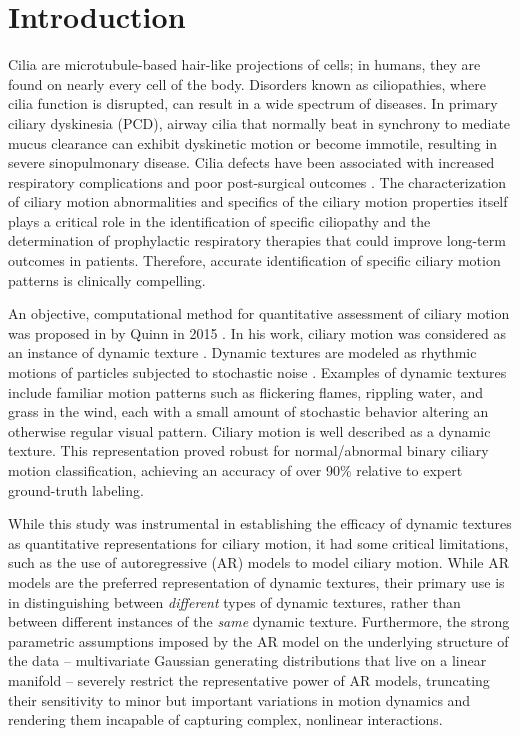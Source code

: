 \section{Introduction}

Cilia are microtubule-based hair-like projections of cells; in humans, they are found on nearly every cell of the body. Disorders known as ciliopathies, where cilia function is disrupted, can result in a wide spectrum of diseases. In primary ciliary dyskinesia (PCD), airway cilia that normally beat in synchrony to mediate mucus clearance can exhibit dyskinetic motion or become immotile, resulting in severe sinopulmonary disease\cite{o2007diagnosing}. Cilia defects have been associated with increased respiratory complications and poor post-surgical outcomes \cite{nakhleh2012high}. The characterization of ciliary motion abnormalities and specifics of the ciliary motion properties itself plays a critical role in the identification of specific ciliopathy and the determination of prophylactic respiratory therapies that could improve long-term outcomes in patients. Therefore, accurate identification of specific ciliary motion patterns is clinically compelling.

An objective, computational method for quantitative assessment of ciliary motion was proposed in by Quinn in 2015 \cite{quinn2015automated}. In his work, ciliary motion was considered as an instance of dynamic texture \cite{saisan2001dynamic}. Dynamic textures are modeled as rhythmic motions of particles subjected to stochastic noise \cite{chen2013automatic}. Examples of dynamic textures include familiar motion patterns such as flickering flames, rippling water, and grass in the wind, each with a small amount of stochastic behavior altering an otherwise regular visual pattern. Ciliary motion is well described as a dynamic texture. This representation proved robust for normal/abnormal binary ciliary motion classification, achieving an accuracy of over 90\% relative to expert ground-truth labeling.

While this study was instrumental in establishing the efficacy of dynamic textures as quantitative representations for ciliary motion, it had some critical limitations, such as the use of autoregressive (AR) models \cite{hyndman2007higher} to model ciliary motion. While AR models are the preferred representation of dynamic textures, their primary use is in distinguishing between \textit{different} types of dynamic textures, rather than between different instances of the \textit{same} dynamic texture. Furthermore, the strong parametric assumptions imposed by the AR model on the underlying structure of the data -- multivariate Gaussian generating distributions that live on a linear manifold -- severely restrict the representative power of AR models, truncating their sensitivity to minor but important variations in motion dynamics and rendering them incapable of capturing complex, nonlinear interactions.

